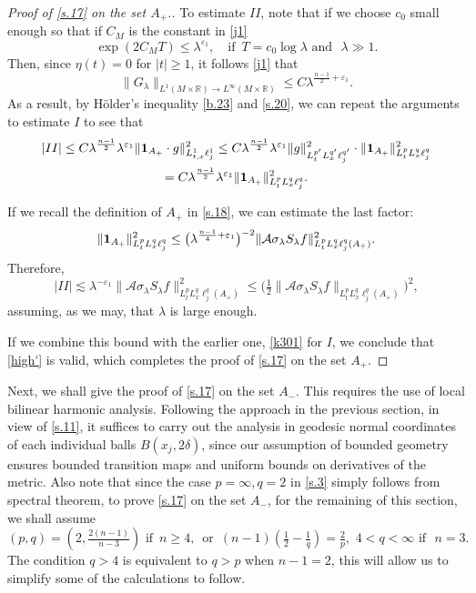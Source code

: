 \documentclass[10pt]{amsart}
\newcommand{\la}{\lambda}
\newcommand{\e}{\varepsilon}
\newcommand{\1}{{\bf 1}}
\newcommand{\R}{{\mathbb R}}
\newcommand{\A}{{\mathcal A}}
\begin{document}
\begin{proof}[Proof of \eqref{s.17} on the set $A_+$.]
To estimate $II$, note that 
if we choose $c_0$ small enough
so that if $C_M$ is the constant
in \eqref{j1}
$$\exp(2C_MT)\le \la^{\e_1}, \quad \text{if  }
\,
T=c_0\log\la \, \, \text{and } \, \, \la \gg 1.
$$
Then, since $\eta(t)=0$ for $|t|\ge1$, it follows
 \eqref{j1} that
$$\|G_\la \|_{L^1(M\times \R) 
\to L^\infty (M\times \R)}\le C
\la^{\frac{n-1}2+{\e_1}}.
$$
As a result, by H\"older's inequality \eqref{b.23} and 
\eqref{s.20}, we can repeat the arguments
to estimate $I$ to see that
\begin{multline}
    |II|\le C\la^{\frac{n-1}2}\la^{\e_1}
\| \1_{A_+}\cdot g\|^2_{L^1_{t,x}\ell^1_j}
\le C \la^{\frac{n-1}2}\la^{\e_1}
\|g\|^2_{L^{p'}_tL^{q'}_x\ell^{q'}_j} \cdot
\|\1_{A_+}\|_{L^{p}_tL^{q}_x\ell^q_j}^2 \\
=C \la^{\frac{n-1}2}\la^{\e_1}
\|\1_{A_+}\|_{L^{p}_tL^{q}_x\ell^q_j}^2.
\end{multline}


If we recall the definition of $A_+$ in
\eqref{s.18}, we can estimate the last
factor:
$$\|\1_{A_+}\|_{L^{p}_tL^{q}_x\ell^q_j}^2
\le \bigl(\la^{\frac{n-1}4+\e_1}\bigr)^{-2}
\|\A\sigma_\la S_\la f\|^2_{{L^{p}_tL^{q}_x}\ell^q_j(A_+)}.$$
Therefore, 
$$|II|\lesssim \la^{-\e_1}
\|\A\sigma_\la S_\la f\|^2_{{L^{p}_tL^{q}_x\ell^q_j}(A_+)}
\le \bigl(\tfrac12 \|\A\sigma_\la S_\la f\|_{{L^{p}_tL^{q}_x\ell^q_j}(A_+)}
\bigr)^2,
$$
assuming, as we may, that $\la$ is large enough.


If we combine this bound with the earlier one,
\eqref{k301} for $I$, we conclude that
\eqref{high'} is valid, which completes the 
proof of \eqref{s.17} on the set $A_+$. 
\end{proof}








Next, we shall give the proof of \eqref{s.17} on the set $A_-$. This requires the use of  local bilinear harmonic
analysis. Following the approach in the previous section, in view of \eqref{s.11}, it suffices to carry out the analysis in geodesic normal coordinates of each individual balls $B(x_j,2\delta)$, since our assumption of bounded geometry ensures
bounded transition maps and uniform bounds on derivatives of the metric. Also note that since the case $p=\infty, q=2$ in \eqref{s.3} simply follows from spectral theorem, to prove  \eqref{s.17} on the set $A_-$, for the remaining of this section, we shall assume
\begin{equation}\label{p}
(p, q)=(2,\tfrac{2(n-1)}{n-3}) \, \,
\text{if } \, n\ge 4, \, \, \, 
\text{or } \, (n-1)(\tfrac12-\tfrac1q)=\tfrac2p, \,\,4< q<\infty \, \, 
\text{if } \, \, n=3.
\end{equation}
The condition $q>4$ is equivalent to $q>p$ when $n-1=2$,
this will allow us to simplify some of the calculations to follow. 
\end{document}
